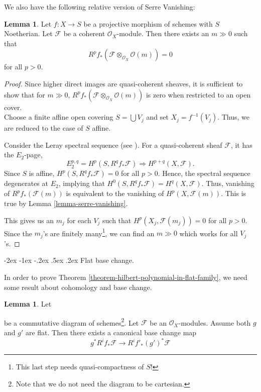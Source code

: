 \documentclass[11pt]{amsart}
\makeatletter
\renewcommand\subsection{\@startsection {subsection}{1}{\z@}%
	{-2ex \@plus -1ex \@minus -.2ex}%
	{.5ex \@plus.2ex}%
	{\normalfont\bfseries}}
\newcommand{\sF}{{\mathcal F}}
\theoremstyle{definition}
\newtheorem{lemma}[theorem]{Lemma}
\makeatother
\begin{document}
We also have the following relative version of Serre Vanishing:

\begin{lemma}\cite[Tag 02O1]{stacks-project}
	\label{lemma-relative-serre-vanishing}
	Let $f : X \to S$ be a projective morphism of schemes with $S$ Noetherian.
	Let $\mathcal{F}$ be a coherent $\mathcal{O}_X$-module.
	Then there exists an $m\gg 0$ such that
	$$
	R^pf_*\left(\mathcal{F} \otimes_{\mathcal{O}_X} \mathcal{O}(m)\right)
	=
	0
	$$
	for all $p > 0$.
\end{lemma}

\begin{proof}
	Since higher direct images are quasi-coherent sheaves, it is sufficient to show that for $m\gg 0$, $R^pf_*\left(\mathcal{F} \otimes_{\mathcal{O}_X} \mathcal{O}(m)\right)$ is zero when restricted to an open cover.\\
	Choose a finite affine open covering $S = \bigcup V_j$ and
	set $X_j = f^{-1}(V_j)$. Thus, we are reduced to the case of $S$ affine.
	
	Consider the Leray spectral sequence (see \cite[Tag 01F2]{stacks-project}). For a quasi-coherent sheaf $\sF$, it has the $E_2$-page,
	\[E_2^{p,q}=H^p(S,R^qf_*\sF)\Rightarrow H^{p+q}(X,\sF).\]
	Since $S$ is affine, $H^p(S,R^qf_*\sF)=0$ for all $p>0$. Hence, the spectral sequence degenerates at $E_2$, implying that $H^0(S,R^qf_*\sF)= H^{q}(X,\sF)$. Thus, vanishing of
	$R^pf_*(\mathcal{F}(m))$
	is equivalent to the vanishing of
	$H^p(X, \mathcal{F}(m))$. This is true by Lemma \ref{lemma-serre-vanishing}.
	
	This gives us an $m_j$ for each $V_j$ such that $H^p(X_j, \mathcal{F}(m_j))=0$ for all $p>0$. Since the $m_j$'s are finitely many\footnote{This last step needs quasi-compactness of $S$!}, we can find an $m\gg 0$ which works for all $V_j$'s.
\end{proof}


\subsection{Flat base change.}

In order to prove Theorem \ref{theorem-hilbert-polynomial-in-flat-family}, we need some result about cohomology and base change.

\begin{lemma}
	\label{lemma-base-change-map-flat-case}
	Let
	\begin{center}
	\end{center}
	be a commutative diagram of schemes\footnote{Note that we do not need the diagram to be cartesian.}.
	Let $\mathcal{F}$ be an	$\mathcal{O}_X$-modules.
	Assume both $g$ and $g'$ are flat.
	Then there exists a canonical base change map
	\[
	g^*R^if_*\mathcal{F}
	\longrightarrow
	R^if'_*(g')^*\mathcal{F}\]
\end{lemma}
\end{document}
